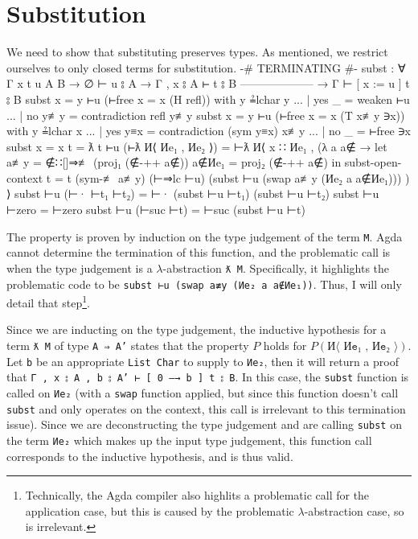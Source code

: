 \documentclass[logo,bsc,singlespacing,parskip,online]{infthesis}
\renewenvironment{code}{\mintedcopy[breaklines,breaksymbolleft=\;]{agda}}{\endmintedcopy}
\begin{document}
\section{Substitution}
We need to show that substituting preserves types. As mentioned, we restrict ourselves to only
closed terms for substitution.
\begin{code}
  {-# TERMINATING #-}
  subst : ∀ {Γ x t u A B}
    → ∅ ⊢ u ⦂ A
    → Γ , x ⦂ A ⊢ t ⦂ B
      --------------------
    → Γ ⊢ [ x := u ] t ⦂ B
  subst {x = y} ⊢u (⊢free {x = x} (H refl)) with y ≟lchar y
  ... | yes _   = weaken ⊢u
  ... | no  y≢y = contradiction refl y≢y
  subst {x = y} ⊢u (⊢free {x = x} (T x≢y ∋x)) with y ≟lchar x
  ... | yes y≡x = contradiction (sym y≡x) x≢y
  ... | no  _   = ⊢free ∋x
  subst {x = x} {t = ƛ t} ⊢u (⊢ƛ И⟨ Иe₁ , Иe₂ ⟩) =
    ⊢ƛ И⟨ x ∷ Иe₁
        , (λ a {a∉} →
          let a≢y   = ∉∷[]⇒≢ (proj₁ (∉-++ a∉))
              a∉Иe₁ = proj₂ (∉-++ a∉)
          in subst-open-context
            {t = t}
            (sym-≢ a≢y)
            (⊢⇒lc ⊢u)
            (subst ⊢u (swap a≢y (Иe₂ a {a∉Иe₁}))) )
        ⟩
  subst ⊢u (⊢· ⊢t₁ ⊢t₂) = ⊢· (subst ⊢u ⊢t₁) (subst ⊢u ⊢t₂)
  subst ⊢u ⊢zero = ⊢zero
  subst ⊢u (⊢suc ⊢t) = ⊢suc (subst ⊢u ⊢t)
\end{code}

The property is proven by induction on the type judgement of the term \texttt{M}. Agda cannot
determine the termination of this function, and the problematic call is when the type judgement is a
$\lambda$-abstraction \texttt{ƛ M}. Specifically, it highlights the problematic code to be
\texttt{subst ⊢u (swap a≢y (Иe₂ a {a∉Иe₁}))}. Thus, I will only detail that
step\footnote{Technically, the Agda compiler also highlits a problematic call for the application
case, but this is caused by the problematic $\lambda$-abstraction case, so is irrelevant.}.

Since we are inducting on the type judgement, the inductive hypothesis for a term \texttt{ƛ M} of
type \texttt{A ⇒ A'} states that the property $P$ holds for $P(\texttt{И⟨ Иe₁ , Иe₂ ⟩})$. Let
\texttt{b} be an appropriate \texttt{List Char} to supply to \texttt{Иe₂}, then it will return a
proof that \texttt{Γ , x ⦂ A , b ⦂ A' ⊢ [ 0 —→ b ] t ⦂ B}. In this case, the \texttt{subst} function
is called on \texttt{Иe₂} (with a \texttt{swap} function applied, but since this function doesn't
call \texttt{subst} and only operates on the context, this call is irrelevant to this termination
issue). Since we are deconstructing the type judgement and are calling \texttt{subst} on the term
\texttt{Иe₂} which makes up the input type judgement, this function call corresponds to the
inductive hypothesis, and is thus valid.
\end{document}
